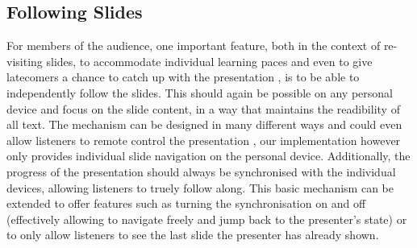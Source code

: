 \subsection{Following Slides}
For members of the audience, one important feature, both in the context of re-visiting slides, to accommodate individual learning paces \cite{Cheng:TreebasedOnlinePresentations} and even to give latecomers a chance to catch up with the presentation \cite{Chattopadhyay:OfficeSocialRemoteControl}, is to be able to independently follow the slides. This should again be possible on any personal device and focus on the slide content, in a way that maintains the readibility of all text. The mechanism can be designed in many different ways and could even allow listeners to remote control the presentation \cite{Chattopadhyay:OfficeSocialRemoteControl}, our implementation however only provides individual slide navigation on the personal device. Additionally, the progress of the presentation should always be synchronised with the individual devices, allowing listeners to truely follow along. This basic mechanism can be extended to offer features such as turning the synchronisation on and off (effectively allowing to navigate freely and jump back to the presenter's state) or to only allow listeners to see the last slide the presenter has already shown.

